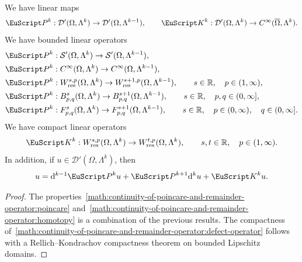 \documentclass[10pt,a4paper]{amsart}
\theoremstyle{definition}
\theoremstyle{remark}
\numberwithin{equation}{section}
\newcommand{\bbR}{{\mathbb R}}
\newcommand{\calD}{{\mathcal D}}
\newcommand{\calS}{{\mathcal S}}
\newcommand{\euK}{{\EuScript K}}
\newcommand{\euP}{{\EuScript P}}
\newcommand{\closure}{\overline}
\newcommand{\cartan}{{\mathrm d}}
\newcommand{\Domain}{{\Omega}}
\newcommand{\Alt}[1]{\Lambda^{#1}}
\newcommand{\Poincare}{\euP}
\newcommand{\Defect}{\euK}
\newcommand{\Wres}{W_{\mathrm{res}}}
\begin{document}
\begin{theorem}\label{theorem:continuity-of-poincare-and-remainder-operator}
    We have linear maps 
    \begin{align*}
        \Poincare^{k} : \calD'(\Domain,\Alt{k}) \to \calD'(\Domain,\Alt{k-1}),
        \qquad 
        \Defect^{k} : \calD'(\Domain,\Alt{k}) \to C^{\infty}(\closure\Domain,\Alt{k}). 
    \end{align*}
    We have bounded linear operators 
    \begin{subequations}\label{math:continuity-of-poincare-and-remainder-operator:poincare}
    \begin{align}
        &\Poincare^{k} : \calS'(\Domain,\Alt{k}) \to \calS'(\Domain,\Alt{k-1}), 
        \\
        &\Poincare^{k} : C^{\infty}(\Domain,\Alt{k}) \to C^{\infty}(\Domain,\Alt{k-1}), 
        \\
        &\Poincare^{k} : \Wres^{s,p}(\Domain,\Alt{k}) \to \Wres^{s+1,p}(\Domain,\Alt{k-1}), \qquad s \in \bbR, \quad p \in (1,\infty),
        \\
        &\Poincare^{k} : B^{s}_{p,q}(\Domain,\Alt{k}) \to B^{s+1}_{p,q}(\Domain,\Alt{k-1}), \qquad s \in \bbR, \quad p,q \in (0,\infty],
        \\
        &\Poincare^{k} : F^{s}_{p,q}(\Domain,\Alt{k}) \to F^{s+1}_{p,q}(\Domain,\Alt{k-1}), \qquad s \in \bbR, \quad p \in (0,\infty), \quad q \in (0,\infty].
    \end{align}
    \end{subequations}
    We have compact linear operators 
    \begin{align}\label{math:continuity-of-poincare-and-remainder-operator:defect-operator}
        \Defect^{k} : \Wres^{s,p}(\Domain,\Alt{k}) \to \Wres^{t,p}(\Domain,\Alt{k}), \qquad s,t \in \bbR, \quad p \in (1,\infty).
    \end{align}
    In addition, if $u \in \calD'(\Domain,\Alt{k})$, then 
    \begin{align}\label{math:continuity-of-poincare-and-remainder-operator:homotopy}
        u = \cartan^{k-1} \Poincare^{k} u + \Poincare^{k+1} \cartan^{k} u + \Defect^{k} u
        .
    \end{align}
\end{theorem}
\begin{proof}
    The properties~\eqref{math:continuity-of-poincare-and-remainder-operator:poincare} and~\eqref{math:continuity-of-poincare-and-remainder-operator:homotopy}  is a combination of the previous results.
    The compactness of~\eqref{math:continuity-of-poincare-and-remainder-operator:defect-operator} follows with a Rellich--Kondrachov compactness theorem on bounded Lipschitz domains. 
\end{proof}
\end{document}

